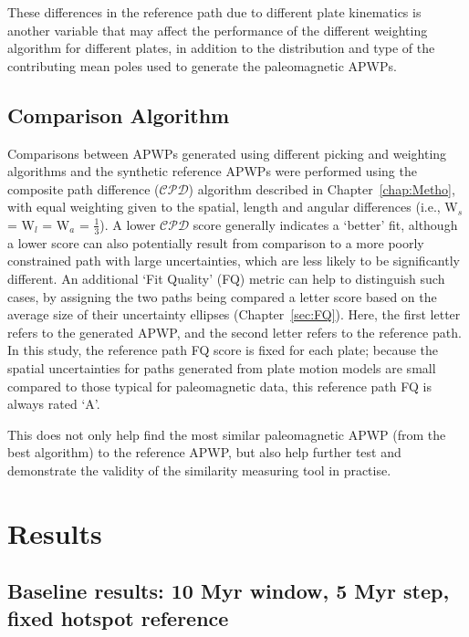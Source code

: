 These differences in the reference path due to different plate kinematics is
another variable that may affect the performance of the different weighting
algorithm for different plates, in addition to the distribution and type of the
contributing mean poles used to generate the paleomagnetic APWPs.

\subsection{Comparison Algorithm}

Comparisons between APWPs generated using different picking and weighting
algorithms and the synthetic reference APWPs were performed using the composite
path difference ($\mathcal{CPD}$) algorithm described in
Chapter~\ref{chap:Metho}, with equal weighting given to the spatial, length and
angular differences (i.e., W$_s$ = W$_l$ = W$_a$ = $\frac{1}{3}$). A lower
$\mathcal{CPD}$ score generally indicates a `better' fit, although a lower score
can also potentially result from comparison to a more poorly constrained path
with large uncertainties, which are less likely to be significantly different.
An additional `Fit Quality' (FQ) metric can help to distinguish such cases, by
assigning the two paths being compared a letter score based on the average size
of their uncertainty ellipses (Chapter~\ref{sec:FQ}). Here, the first letter
refers to the generated APWP, and the second letter refers to the reference
path. In this study, the reference path FQ score is fixed for each plate;
because the spatial uncertainties for paths generated from plate motion models
are small compared to those typical for paleomagnetic data, this reference path
FQ is always rated `A'.

This does not only help find the most similar paleomagnetic APWP (from the best
algorithm) to the reference APWP, but also help further test and demonstrate the
validity of the similarity measuring tool in practise.

\section{Results}

\subsection{Baseline results: 10 Myr window, 5 Myr step, fixed hotspot
reference}\label{sec:base}

